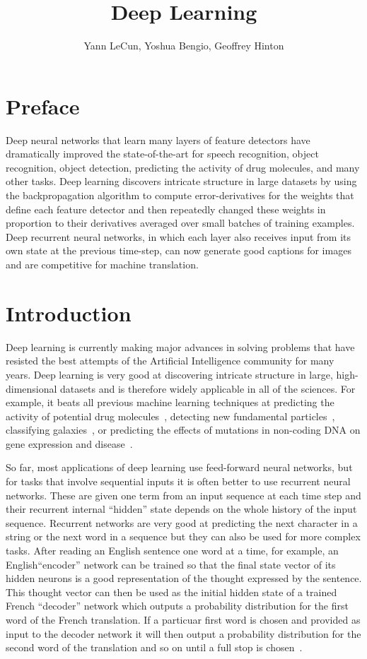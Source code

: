 \documentclass[]{article}
\title{Deep Learning}
\author{Yann LeCun, Yoshua Bengio, Geoffrey Hinton}
\begin{document}
\maketitle

\section{Preface}

Deep neural networks that learn many layers of feature detectors have
dramatically improved the state-of-the-art for speech recognition, object
recognition, object detection, predicting the activity of drug molecules,
and many other tasks. Deep learning discovers intricate structure in large
datasets by using the backpropagation algorithm to compute
error-derivatives for the weights that define each feature detector and
then repeatedly changed these weights in proportion to their derivatives
averaged over small batches of training examples.  Deep recurrent neural
networks, in which each layer also receives input from its own state at the
previous time-step, can now generate good captions for images and are
competitive for machine translation.

\section{Introduction}

Deep learning is currently making major advances in solving problems that
have resisted the best attempts of the Artificial Intelligence community
for many years. Deep learning is very good at discovering intricate
structure in large, high-dimensional datasets and is therefore widely
applicable in all of the sciences. For example, it beats all previous
machine learning techniques at predicting the activity of potential drug
molecules~\cite{Dahl}, detecting new fundamental particles~\cite{??},
classifying galaxies~\cite{??}, or predicting the effects of mutations in
non-coding DNA on gene expression and disease~\cite{Frey}.

So far, most applications of deep learning use feed-forward neural
networks, but for tasks that involve sequential inputs it is often better
to use recurrent neural networks. These are given one term from an input
sequence at each time step and their recurrent internal ``hidden'' state
depends on the whole history of the input sequence. Recurrent networks are
very good at predicting the next character in a string\cite{Sutskever} or
the next word in a sequence\cite{Mikolov} but they can also be used for
more complex tasks.  After reading an English sentence one word at a time,
for example, an English``encoder'' network can be trained so that the final
state vector of its hidden neurons is a good representation of the thought
expressed by the sentence.  This thought vector can then be used as the
initial hidden state of a trained French ``decoder'' network which outputs
a probability distribution for the first word of the French translation. If
a particuar first word is chosen and provided as input to the decoder
network it will then output a probability distribution for the second word
of the translation and so on until a full stop is chosen~\cite{Vinyals,
  Montreal}.
\end{document}
